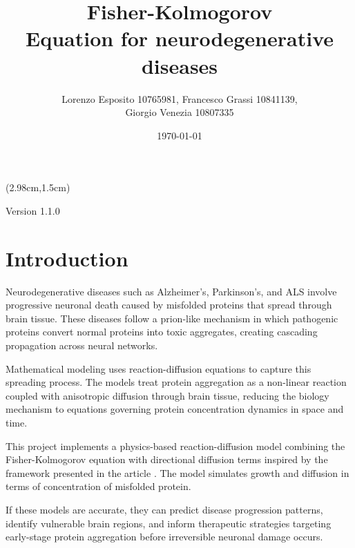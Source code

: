 \documentclass[12pt, a4paper, twoside, openright]{report}
\title{\textbf{Fisher-Kolmogorov}\\Equation for neurodegenerative diseases}
\author{Lorenzo Esposito 10765981, Francesco Grassi 10841139, \\Giorgio Venezia 10807335}
\date{\today}
\begin{document}
\begin{textblock*}{\textwidth}(2.98cm,1.5cm)
  \begin{center}
    \maketitle
    Version 1.1.0
  \end{center}
\end{textblock*}


\blankpage

\tableofcontents
\afterpage{\blankpage}
\newpage
{}

\chapter{Introduction}

Neurodegenerative diseases such as Alzheimer's, Parkinson's, and ALS involve progressive neuronal death caused by misfolded proteins that spread through brain tissue. These diseases follow a prion-like mechanism in which pathogenic proteins convert normal proteins into toxic aggregates, creating cascading propagation across neural networks.

Mathematical modeling uses reaction-diffusion equations to capture this spreading process. The models treat protein aggregation as a non-linear reaction coupled with anisotropic diffusion through brain tissue, reducing the biology mechanism to equations governing protein concentration dynamics in space and time.

This project implements a physics-based reaction-diffusion model combining the Fisher-Kolmogorov equation with directional diffusion terms inspired by the framework presented in the article \cite{WEICKENMEIER2019264}. The model simulates growth and diffusion in terms of concentration of misfolded protein.

If these models are accurate, they can predict disease progression patterns, identify vulnerable brain regions, and inform therapeutic strategies targeting early-stage protein aggregation before irreversible neuronal damage occurs.
\end{document}
